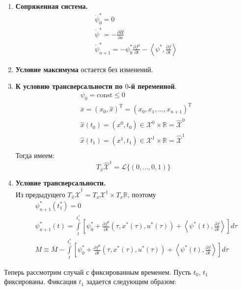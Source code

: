 \documentclass[oneside, final, 14pt, draft]{article}
\theoremstyle{definition}
\theoremstyle{definition}
\theoremstyle{remark}
\theoremstyle{theorem}
\renewcommand{\leq}{\leqslant}
\begin{document}
\begin{enumerate}

\item \textbf{Сопряженная система.}\\
\begin{align*}
&\dot{\psi}_0^* = 0\\
&\dot{\psi}^* = -\frac{\partial H}{\partial x}\\
&\dot{\psi}_{n+1}^* = - \psi_0^*\frac{\partial f^0}{\partial t} - \left\langle \psi^*, \frac{\partial f}{\partial t}\right\rangle
\end{align*}

\item \textbf{Условие максимума} остается без изменений.

\item \textbf{К условию трансверсальности по $0$-й переменной}.
\begin{align*}
&\psi_0 = \mathrm{const} \leq 0\\
&\overline{x} = (x_0,\widehat{x})^\mathrm{T} = (x_0,x_1,\ldots, x_{n+1})^\mathrm{T}\\
&\widehat{x} (t_0) = (x^0,t_0)\in \mathcal{X}^0\times\mathbb{R} = \widehat{\mathcal{X}}^0\\
&\widehat{x} (t_1) = (x^1,t_1) \in \mathcal{X}^1\times\mathbb{R}=\widehat{\mathcal{X}}^1\\
\end{align*}
Тогда имеем:
$$T_{\widehat{x}} \widehat{\mathcal{X}}^1 = \mathcal{L}\{(0, ..., 0, 1)\}$$

\item \textbf{Условие трансверсальности.} \\
Из предыдущего $T_{\widehat{x}} \widehat{\mathcal{X}}^1 = T_x \mathcal{X}^1 \times T_x \mathbb{R}$, поэтому
\begin{align*}
&\psi_{n+1}^*(t_1^*) = 0\\
&\psi_{n+1}^* (t) = \int\limits_t^{t_1^*}\left[ \psi_0^* + \frac{\partial f^0}{\partial t}(\tau, x^*(\tau), u^*(\tau)) + \left\langle \psi^*(t), \frac{\partial f}{\partial t}\right\rangle\right]d\tau\\
&M \equiv \overline{M} - \int\limits_t^{t_1^*}\left[ \psi_0^* + \frac{\partial f^0}{\partial t}(\tau, x^*(\tau), u^*(\tau)) + \left\langle \psi^*(t), \frac{\partial f}{\partial t}\right\rangle\right]d\tau
\end{align*}

\end{enumerate}

Теперь рассмотрим случай с фиксированным временем. Пусть $t_0,\,t_1$ фиксированы. Фиксация $t_1$ задается следующим образом:
\end{document}

